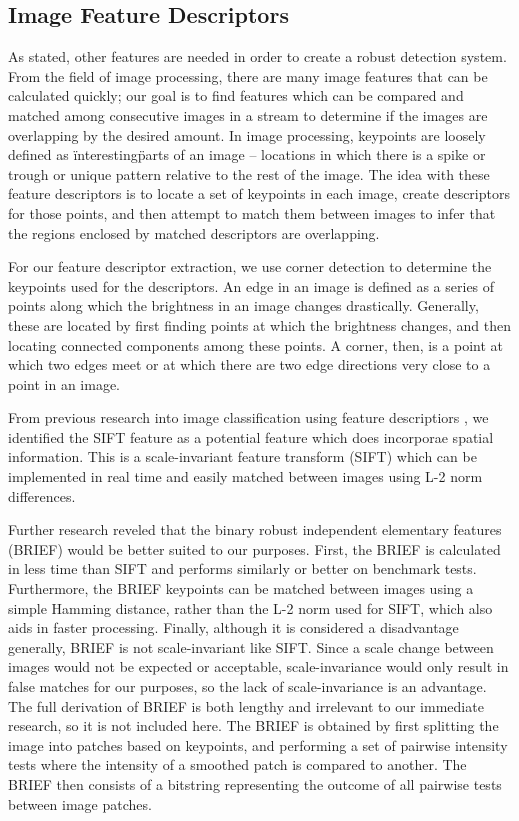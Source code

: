 \subsection{Image Feature Descriptors}

As stated, other features are needed in order to create a robust detection system.
From the field of image processing, there are many image features that can be calculated quickly; our goal is to find features which can be compared and matched among consecutive images in a stream to determine if the images are overlapping by the desired amount.
In image processing, keypoints are loosely defined as \"interesting\" parts of an image -- locations in which there is a spike or trough or unique pattern relative to the rest of the image.
The idea with these feature descriptors is to locate a set of keypoints in each image, create descriptors for those points, and then attempt to match them between images to infer that the regions enclosed by matched descriptors are overlapping.

For our feature descriptor extraction, we use corner detection to determine the keypoints used for the descriptors.
An edge in an image is defined as a series of points along which the brightness in an image changes drastically.
Generally, these are located by first finding points at which the brightness changes, and then locating connected components among these points.
A corner, then, is a point at which two edges meet or at which there are two edge directions very close to a point in an image.


From previous research into image classification using feature descriptiors \cite{anomalyhyper}, we identified the SIFT feature as a potential feature which does incorporae spatial information.
This is a scale-invariant feature transform (SIFT) which can be implemented in real time and easily matched between images using L-2 norm differences.


Further research reveled that the binary robust independent elementary features (BRIEF) would be better suited to our purposes.
First, the BRIEF is calculated in less time than SIFT and performs similarly or better on benchmark tests.
Furthermore, the BRIEF keypoints can be matched between images using a simple Hamming distance, rather than the L-2 norm used for SIFT, which also aids in faster processing.
Finally, although it is considered a disadvantage generally, BRIEF is not scale-invariant like SIFT.
Since a scale change between images would not be expected or acceptable, scale-invariance would only result in false matches for our purposes, so the lack of scale-invariance is an advantage.
The full derivation of BRIEF is both lengthy and irrelevant to our immediate research, so it is not included here.
The BRIEF is obtained by first splitting the image into patches based on keypoints, and performing a set of pairwise intensity tests where the intensity of a smoothed patch is compared to another. 
The BRIEF then consists of a bitstring representing the outcome of all pairwise tests between image patches.

